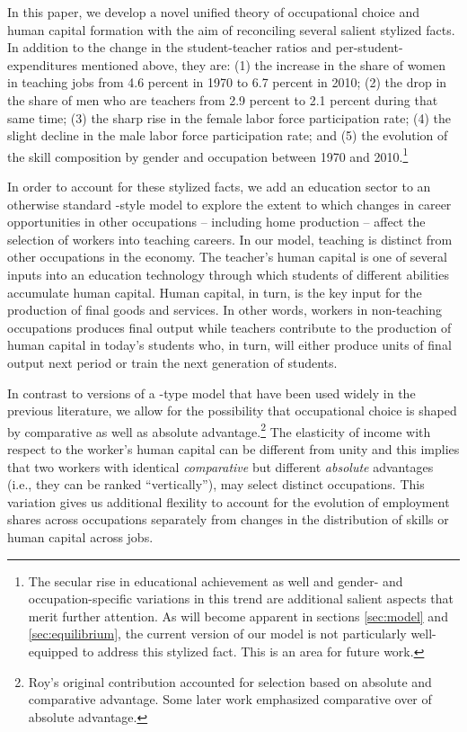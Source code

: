 \documentclass[onehalfspacing,11pt]{article}
\begin{document}
	In this paper, we develop a novel unified theory of occupational choice and human capital formation with the aim of reconciling several salient stylized facts. In addition to the change in the student-teacher ratios and per-student-expenditures mentioned above, they are: (1) the increase in the share of women in teaching jobs from 4.6 percent in 1970 to 6.7 percent in 2010; (2) the drop in the share of men who are teachers from 2.9 percent to 2.1 percent during that same time; (3) the sharp rise in the female labor force participation rate; (4) the slight decline in the male labor force participation rate; and (5) the evolution of the skill composition by gender and occupation between 1970 and 2010.\footnote{The secular rise in educational achievement as well and gender- and occupation-specific variations in this trend are additional salient aspects that merit further attention. As will become apparent in sections \ref{sec:model} and \ref{sec:equilibrium}, the current version of our model is not particularly well-equipped to address this stylized fact. This is an area for future work.}
	
	In order to account for these stylized facts, we add an education sector to an otherwise standard \cite{Hsieh:2019}-style model to explore the extent to which changes in career opportunities in other occupations -- including home production -- affect the selection of workers into teaching careers. In our model, teaching is distinct from other occupations in the economy. The teacher's human capital is one of several inputs into an education technology through which students of different abilities accumulate human capital. Human capital, in turn, is the key input for the production of final goods and services. In other words, workers in non-teaching occupations produces final output while teachers contribute to the production of human capital in today's students who, in turn, will either produce units of final output next period or train the next generation of students.%
	
	In contrast to versions of a \cite{Roy:1951}-type model that have been used widely in the previous literature, we allow for the possibility that occupational choice is shaped by comparative as well as absolute advantage.\footnote{Roy's original contribution accounted for selection based on absolute and comparative advantage. Some later work emphasized comparative over of absolute advantage.} The elasticity of income with respect to the worker's human capital can be different from unity and this implies that two workers with identical {\it comparative} but different {\it absolute} advantages (i.e., they can be ranked ``vertically''), may select distinct occupations. This variation gives us additional flexility to account for the evolution of employment shares across occupations separately from changes in the distribution of skills or human capital across jobs.
	
\end{document}
